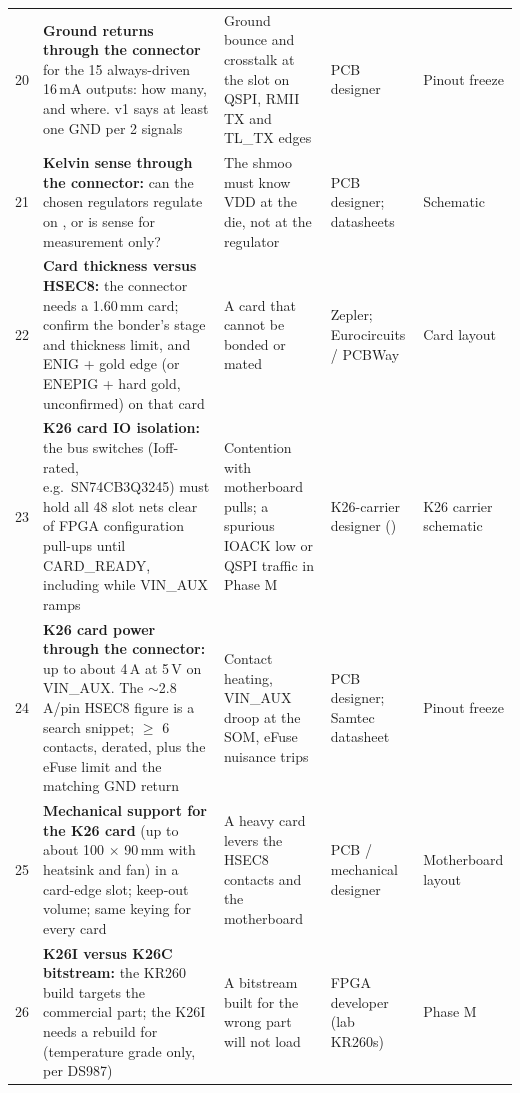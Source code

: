 \documentclass[10pt,a4paper]{article}
\begin{document}
{\begin{longtable}{@{}P{0.45cm}P{5.0cm}P{5.0cm}P{2.6cm}P{2.4cm}@{}}
20 & \textbf{Ground returns through the connector} for the 15 always-driven 16\,mA outputs: how many, and where. v1 says at least one GND per 2 signals & Ground bounce and crosstalk at the slot on QSPI, RMII TX and TL\_TX edges & PCB designer & Pinout freeze \\
21 & \textbf{Kelvin sense through the connector:} can the chosen regulators regulate on , or is sense for measurement only? & The shmoo must know VDD at the die, not at the regulator & PCB designer; datasheets & Schematic \\
22 & \textbf{Card thickness versus HSEC8:} the connector needs a 1.60\,mm card; confirm the bonder's stage and thickness limit, and ENIG + gold edge (or ENEPIG + hard gold, unconfirmed) on that card & A card that cannot be bonded or mated & Zepler; Eurocircuits / PCBWay & Card layout \\
23 & \textbf{K26 card IO isolation:} the bus switches (Ioff-rated, e.g.\ SN74CB3Q3245) must hold all 48 slot nets clear of FPGA configuration pull-ups until CARD\_READY, including while VIN\_AUX ramps & Contention with motherboard pulls; a spurious IOACK low or QSPI traffic in Phase M & K26-carrier designer () & K26 carrier schematic \\
24 & \textbf{K26 card power through the connector:} up to about 4\,A at 5\,V on VIN\_AUX. The $\sim$2.8\,A/pin HSEC8 figure is a search snippet; $\ge$ 6 contacts, derated, plus the eFuse limit and the matching GND return & Contact heating, VIN\_AUX droop at the SOM, eFuse nuisance trips & PCB designer; Samtec datasheet & Pinout freeze \\
25 & \textbf{Mechanical support for the K26 card} (up to about 100 $\times$ 90\,mm with heatsink and fan) in a card-edge slot; keep-out volume; same keying for every card & A heavy card levers the HSEC8 contacts and the motherboard & PCB / mechanical designer & Motherboard layout \\
26 & \textbf{K26I versus K26C bitstream:} the KR260 build targets the commercial part; the K26I needs a rebuild for  (temperature grade only, per DS987) & A bitstream built for the wrong part will not load & FPGA developer (lab KR260s) & Phase M \\
\bottomrule
\end{longtable}\addtocounter{table}{-1}}

\appendix
{}
\end{document}
